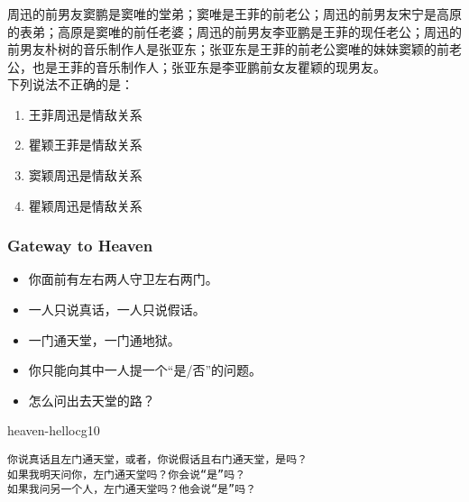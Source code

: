 \documentclass[UTF8,aspectratio=43,11pt,colorlinks,compress,openany]{beamer}%
\begin{document}
\begin{frame}\frametitle{}
\begin{problem}
周迅的前男友窦鹏是窦唯的堂弟；窦唯是王菲的前老公；周迅的前男友宋宁是高原的表弟；高原是窦唯的前任老婆；周迅的前男友李亚鹏是王菲的现任老公；周迅的前男友朴树的音乐制作人是张亚东；张亚东是王菲的前老公窦唯的妹妹窦颖的前老公，也是王菲的音乐制作人；张亚东是李亚鹏前女友瞿颖的现男友。\\
下列说法不正确的是：
\begin{enumerate}
\item 王菲周迅是情敌关系
\item 瞿颖王菲是情敌关系
\item 窦颖周迅是情敌关系
\item 瞿颖周迅是情敌关系
\end{enumerate}
\end{problem}
\end{frame}

\begin{frame}[fragile]\frametitle{Gateway to Heaven}
	\begin{problem}
		\begin{itemize}
			\item 你面前有左右两人守卫左右两门。
			\item 一人只说真话，一人只说假话。
			\item 一门通天堂，一门通地狱。
			\item 你只能向其中一人提一个“是/否”的问题。
			\item 怎么问出去天堂的路？
		\end{itemize}
	\end{problem}
\begin{ocg}{heaven-hell}{ocg1}{0}
\begin{verbatim}
你说真话且左门通天堂，或者，你说假话且右门通天堂，是吗？
如果我明天问你，左门通天堂吗？你会说“是”吗？
如果我问另一个人，左门通天堂吗？他会说“是”吗？
\end{verbatim}
\end{ocg}
\end{frame}
\end{document}
